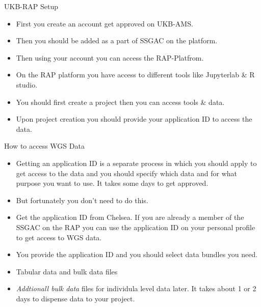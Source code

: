 \documentclass{beamer}
\begin{document}
\begin{frame}{UKB-RAP Setup}

      \begin{itemize}
            \item First you create an account get approved on UKB-AMS.
            \item Then you should be added as a part of SSGAC on the platform.
            \item Then using your account you can access the RAP-Platfrom.
            \item On the RAP platform you have access to different tools
            like Jupyterlab \& R studio. 
            \item You should first create a project then you can access tools \& data.
            \item Upon project creation you should provide your application ID to access the data.
      \end{itemize}

      
\end{frame}



\begin{frame}{How to access WGS Data}

      \begin{itemize}
            \item Getting an application ID is a separate process in which you
            should apply to get access to the data and you should specify which
            data and for what purpose you want to use. It takes some days to get
            approved.
            \item But fortunately you don't need to do this.
            \item Get the application ID from Chelsea. If you are already 
            a member of the SSGAC on the RAP you can use the application ID on your
            personal profile to get access to WGS data.
            \item You provide the application ID and you should select data bundles you need.
            \item Tabular data and bulk data files
            \item \textit{Addtionall bulk data} files for individula level data later. It takes about 1 or 2 days to dispense data to your project.
      \end{itemize}

\end{frame}
\end{document}
